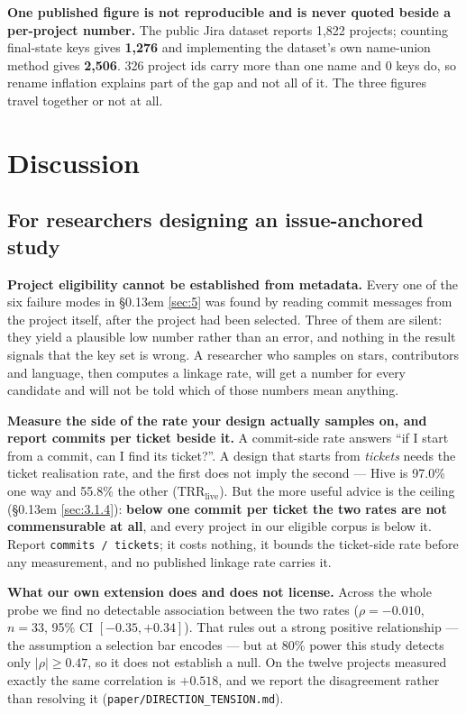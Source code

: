 \documentclass[conference]{IEEEtran}
\begin{document}
\textbf{One published figure is not reproducible and is never quoted beside a per-project number.} The public Jira dataset reports 1,822 projects; counting final-state keys gives \textbf{1,276} and implementing the dataset's own name-union method gives \textbf{2,506}. 326 project ids carry more than one name and 0 keys do, so rename inflation explains part of the gap and not all of it. The three figures travel together or not at all.


\section{Discussion}
\label{sec:7}

\subsection{For researchers designing an issue-anchored study}
\label{sec:7.1}

\textbf{Project eligibility cannot be established from metadata.} Every one of the six failure modes in \S\kern0.13em \ref{sec:5} was found by reading commit messages from the project itself, after the project had been selected. Three of them are silent: they yield a plausible low number rather than an error, and nothing in the result signals that the key set is wrong. A researcher who samples on stars, contributors and language, then computes a linkage rate, will get a number for every candidate and will not be told which of those numbers mean anything.

\textbf{Measure the side of the rate your design actually samples on, and report commits per ticket beside it.} A commit-side rate answers ``if I start from a commit, can I find its ticket?''. A design that starts from \emph{tickets} needs the ticket realisation rate, and the first does not imply the second --- Hive is 97.0\% one way and 55.8\% the other ($\mathrm{TRR}_\mathrm{live}$). But the more useful advice is the ceiling (\S\kern0.13em \ref{sec:3.1.4}): \textbf{below one commit per ticket the two rates are not commensurable at all}, and every project in our eligible corpus is below it. Report \texttt{commits /\allowbreak{} tickets}; it costs nothing, it bounds the ticket-side rate before any measurement, and no published linkage rate carries it.

\textbf{What our own extension does and does not license.} Across the whole probe we find no detectable association between the two rates ($\rho = -0.010$, $n = 33$, 95\% CI $[-0.35, +0.34]$). That rules out a strong positive relationship --- the assumption a selection bar encodes --- but at 80\% power this study detects only $\lvert \rho \rvert \geq 0.47$, so it does not establish a null. On the twelve projects measured exactly the same correlation is $+0.518$, and we report the disagreement rather than resolving it (\texttt{paper/\allowbreak{}DIRECTION\_\allowbreak{}TENSION.\allowbreak{}md}).
\end{document}

